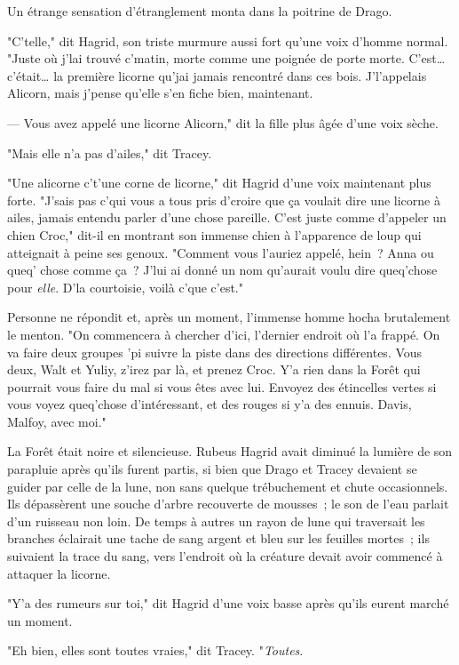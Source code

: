Un étrange sensation d'étranglement monta dans la poitrine de Drago.

"C'telle," dit Hagrid, son triste murmure aussi fort qu'une voix d'homme normal. "Juste où j'lai trouvé c'matin, morte comme une poignée de porte morte. C'est… c'était… la première licorne qu'jai jamais rencontré dans ces bois. J'l'appelais Alicorn, mais j'pense qu'elle s'en fiche bien, maintenant.

--- Vous avez appelé une licorne Alicorn," dit la fille plus âgée d'une voix sèche.

"Mais elle n'a pas d'ailes," dit Tracey.

"Une alicorne c't'une corne de licorne," dit Hagrid d'une voix maintenant plus forte. "J'sais pas c'qui vous a tous pris d'croire que ça voulait dire une licorne à ailes, jamais entendu parler d'une chose pareille. C'est juste comme d'appeler un chien Croc," dit-il en montrant son immense chien à l'apparence de loup qui atteignait à peine ses genoux. "Comment vous l'auriez appelé, hein~? Anna ou queq' chose comme ça~? J'lui ai donné un nom qu'aurait voulu dire queq'chose pour \emph{elle}. D'la courtoisie, voilà c'que c'est."

Personne ne répondit et, après un moment, l'immense homme hocha brutalement le menton. "On commencera à chercher d'ici, l'dernier endroit où l'a frappé. On va faire deux groupes 'pi suivre la piste dans des directions différentes. Vous deux, Walt et Yuliy, z'irez par là, et prenez Croc. Y'a rien dans la Forêt qui pourrait vous faire du mal si vous êtes avec lui. Envoyez des étincelles vertes si vous voyez queq'chose d'intéressant, et des rouges si y'a des ennuis. Davis, Malfoy, avec moi."

La Forêt était noire et silencieuse. Rubeus Hagrid avait diminué la lumière de son parapluie après qu'ils furent partis, si bien que Drago et Tracey devaient se guider par celle de la lune, non sans quelque trébuchement et chute occasionnels. Ils dépassèrent une souche d'arbre recouverte de mousses~; le son de l'eau parlait d'un ruisseau non loin. De temps à autres un rayon de lune qui traversait les branches éclairait une tache de sang argent et bleu sur les feuilles mortes~; ils suivaient la trace du sang, vers l'endroit où la créature devait avoir commencé à attaquer la licorne.

"Y'a des rumeurs sur toi," dit Hagrid d'une voix basse après qu'ils eurent marché un moment.

"Eh bien, elles sont toutes vraies," dit Tracey. "\emph{Toutes}.

